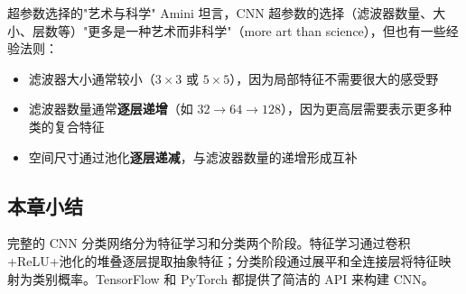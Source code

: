 \begin{knowledgebox}{超参数选择的"艺术与科学"}
Amini 坦言，CNN 超参数的选择（滤波器数量、大小、层数等）"更多是一种艺术而非科学"（more art than science），但也有一些经验法则：
\begin{itemize}
    \item 滤波器大小通常较小（$3 \times 3$ 或 $5 \times 5$），因为局部特征不需要很大的感受野
    \item 滤波器数量通常\textbf{逐层递增}（如 $32 \rightarrow 64 \rightarrow 128$），因为更高层需要表示更多种类的复合特征
    \item 空间尺寸通过池化\textbf{逐层递减}，与滤波器数量的递增形成互补
\end{itemize}
\end{knowledgebox}

\subsection{本章小结}

完整的 CNN 分类网络分为特征学习和分类两个阶段。特征学习通过卷积+ReLU+池化的堆叠逐层提取抽象特征；分类阶段通过展平和全连接层将特征映射为类别概率。TensorFlow 和 PyTorch 都提供了简洁的 API 来构建 CNN。

\newpage
